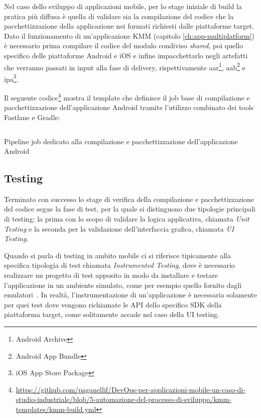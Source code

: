 Nel caso dello sviluppo di applicazioni mobile, 
per lo stage iniziale di build la pratica più diffusa è quella di validare sia la compilazione del codice che la pacchettizzazione della applicazione nei formati richiesti dalle piattaforme target. 
Dato il funzionamento di un'applicazione KMM (capitolo \ref{ch:app-multiplatform}) è necessario prima compilare il codice del modulo condiviso \textit{shared}, 
poi quello specifico delle piattaforme Android e iOS e infine impacchettarlo negli artefatti che verranno passati in input alla fase di delivery, 
rispettivamente aar\footnote{Android Archive}, 
aab\footnote{Android App Bundle} e ipa\footnote{iOS App Store Package}.

Il seguente codice\footnote{\href{https://github.com/paganellif/DevOps-per-applicazioni-mobile-un-caso-di-studio-industriale/blob/5-automazione-del-processo-di-sviluppo/kmm-templates/kmm-build.yml}{https://github.com/paganellif/DevOps-per-applicazioni-mobile-un-caso-di-studio-industriale/blob/5-automazione-del-processo-di-sviluppo/kmm-templates/kmm-build.yml}} mostra il template che definisce il job base di compilazione e pacchettizzazione dell'applicazione Android tramite l'utilizzo combinato dei tools Fastlane e Gradle:

\begin{listing}[H]
    \inputminted{yaml}{code/build-job.yaml}
    \caption{Pipeline job dedicato alla compilazione e pacchettizzazione dell'applicazione Android}
\end{listing}

\subsection{Testing}
Terminato con successo lo stage di verifica della compilazione e pacchettizzazione del codice segue la fase di test,
per la quale si distinguono due tipologie principali di testing: 
la prima con lo scopo di validare la logica applicativa, 
chiamata \textit{Unit Testing} e la seconda per la validazione dell'interfaccia grafica, 
chiamata \textit{UI Testing}.

Quando si parla di testing in ambito mobile ci si riferisce tipicamente alla specifica tipologia di test chiamata \textit{Instrumented Testing}, 
dove è necessario realizzare un progetto di test apposito 
in modo da installare e testare l'applicazione in un ambiente simulato,
come per esempio quello fornito dagli emulatori~\cite{darwin2011android}. 
In realtà,
l'instrumentazione di un'applicazione è necessaria solamente per quei test dove vengono richiamate le API dello specifico SDK della piattaforma target, 
come solitamente accade nel caso della UI testing.


